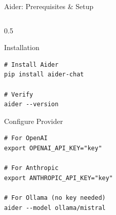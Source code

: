 \documentclass[aspectratio=169,11pt]{beamer}
\begin{document}
\begin{frame}[fragile]{Aider: Prerequisites \& Setup}
\begin{columns}[T]
\begin{column}{0.5\textwidth}
\begin{block}{Installation}
\begin{lstlisting}[style=bash]
# Install Aider
pip install aider-chat

# Verify
aider --version
                \end{lstlisting}
            \end{block}

            \begin{block}{Configure Provider}
                \begin{lstlisting}[style=bash]
# For OpenAI
export OPENAI_API_KEY="key"

# For Anthropic
export ANTHROPIC_API_KEY="key"

# For Ollama (no key needed)
aider --model ollama/mistral
                \end{lstlisting}
            \end{block}
        \end{column}
    \end{columns}

\end{frame}
\end{document}
